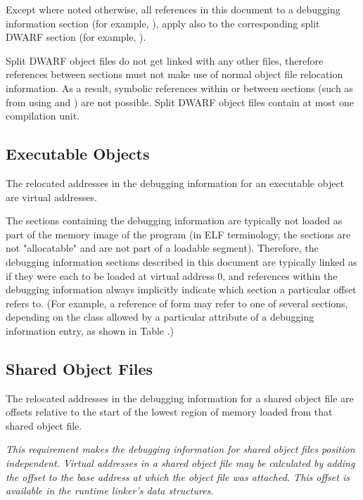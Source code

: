 Except where noted otherwise, all references in this document
to a debugging information section (for example, \dotdebuginfo),
apply also to the corresponding split DWARF section (for example,
\dotdebuginfodwo).

Split DWARF object files do not get linked with any other files,
therefore references between sections must not make use of
normal object file relocation information. As a result, symbolic
references within or between sections 
\bb
(such as from using \DWFORMrefaddr{} and \DWOPcallref)
\eb
are not possible.
\bb
Split DWARF object files contain at most one compilation unit.
\eb

\subsection{Executable Objects}
\label{chap:executableobjects}
The relocated addresses in the debugging information for an
executable object are virtual addresses.

The sections containing the debugging information are typically
not loaded as part of the memory image of the program (in ELF
terminology, the sections are not "allocatable" and are not part
of a loadable segment). Therefore, the debugging information
sections described in this document are typically linked as if
they were each to be loaded at virtual address 0, and references
within the debugging information always implicitly indicate which
section a particular offset refers to. (For example, a reference
of form \DWFORMsecoffset{} may refer to one of several sections,
depending on the class allowed by a particular attribute of a
debugging information entry, as shown in 
Table .)

\subsection{Shared Object Files}
\label{datarep:sharedobjectfiles}
The relocated
addresses in the debugging information for a shared object file
are offsets relative to the start of the lowest region of
memory loaded from that shared object file.

\textit{This requirement makes the debugging information for
shared object files position independent.  Virtual addresses in a
shared object file may be calculated by adding the offset to the
base address at which the object file was attached. This offset
is available in the run\dash time linker\textquoteright s data structures.}

